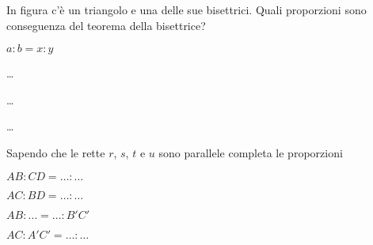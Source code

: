 \begin{esercizio}
\label{ese:6.33}
In figura c'è un triangolo e una delle sue bisettrici. Quali proporzioni sono conseguenza del teorema della bisettrice?
\begin{enumeratea}
\item $a : b = x : y$
\item \ldots{}
\item \ldots{}
\item \ldots{}
\end{enumeratea}
\end{esercizio}

\begin{esercizio}
\label{ese:6.34}
Sapendo che le rette $r$, $s$, $t$ e $u$ sono parallele completa le proporzioni
\begin{enumeratea}
\item $AB : CD = \ldots{} : \ldots{}$
\item $AC : BD = \ldots{} : \ldots{}$
\item $AB : \ldots{} = \ldots{} : B'C'$
\item $AC : A'C' = \ldots{} : \ldots{}$
\end{enumeratea}
\end{esercizio}

